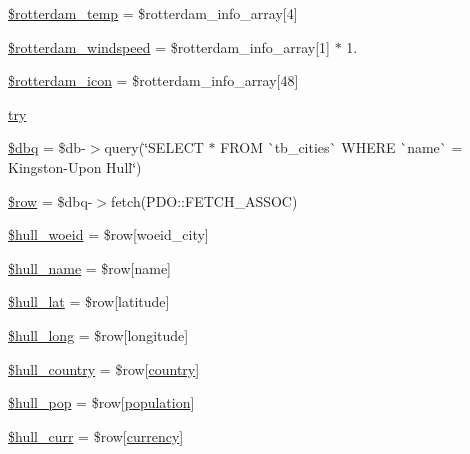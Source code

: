 \begin{DoxyCompactItemize}
\item 
\mbox{\hyperlink{index_8php_a7d5783f258dc82ac9156c855be8f2d9a}{\$rotterdam\+\_\+temp}} = \$rotterdam\+\_\+info\+\_\+array\mbox{[}4\mbox{]}
\item 
\mbox{\hyperlink{index_8php_a9e1bd1fab9ba49731a47922e12661ef5}{\$rotterdam\+\_\+windspeed}} = \$rotterdam\+\_\+info\+\_\+array\mbox{[}1\mbox{]} $\ast$ 1.
\item 
\mbox{\hyperlink{index_8php_a917dfb18ffe5dce2f66b78a2ab25bb2e}{\$rotterdam\+\_\+icon}} = \$rotterdam\+\_\+info\+\_\+array\mbox{[}48\mbox{]}
\item 
\mbox{\hyperlink{index_8php_a3d12b343d049cdea93240f06b0e8467c}{try}}
\item 
\mbox{\hyperlink{index_8php_ab76933014035168a37e7e525ca8fbabe}{\$dbq}} = \$db-\/$>$query(\char`\"{}S\+E\+L\+E\+CT $\ast$ F\+R\+OM \`{}tb\+\_\+cities\`{} W\+H\+E\+RE \`{}name\`{} = \textquotesingle{}Kingston-\/Upon Hull\textquotesingle{}\char`\"{})
\item 
\mbox{\hyperlink{index_8php_aa1d731aa570613e5bcff831bb10e9b87}{\$row}} = \$dbq-\/$>$fetch(P\+D\+O\+::\+F\+E\+T\+C\+H\+\_\+\+A\+S\+S\+OC)
\item 
\mbox{\hyperlink{index_8php_a0255f88ae7eba38efbea0defdb8268a2}{\$hull\+\_\+woeid}} = \$row\mbox{[}\textquotesingle{}woeid\+\_\+city\textquotesingle{}\mbox{]}
\item 
\mbox{\hyperlink{index_8php_a5152ab3c5de633a3e7e5620ac57cf288}{\$hull\+\_\+name}} = \$row\mbox{[}\textquotesingle{}name\textquotesingle{}\mbox{]}
\item 
\mbox{\hyperlink{index_8php_a579767912e585d5819aa7bfe22e174f8}{\$hull\+\_\+lat}} = \$row\mbox{[}\textquotesingle{}latitude\textquotesingle{}\mbox{]}
\item 
\mbox{\hyperlink{index_8php_af542f209855ac8d02cd14c494f6ea9c9}{\$hull\+\_\+long}} = \$row\mbox{[}\textquotesingle{}longitude\textquotesingle{}\mbox{]}
\item 
\mbox{\hyperlink{index_8php_afba36b1379b54ac2b75e704c548b3f2c}{\$hull\+\_\+country}} = \$row\mbox{[}\textquotesingle{}\mbox{\hyperlink{index_8php_a0f0752705301c982dc8994ebc993e6e9}{country}}\textquotesingle{}\mbox{]}
\item 
\mbox{\hyperlink{index_8php_a009564d1c0613f4835396733f31920c0}{\$hull\+\_\+pop}} = \$row\mbox{[}\textquotesingle{}\mbox{\hyperlink{index_8php_aa78fa356925cd3f67d485c4d6846202b}{population}}\textquotesingle{}\mbox{]}
\item 
\mbox{\hyperlink{index_8php_a0a1e0de1e05cca55159a2ce410ea2ac9}{\$hull\+\_\+curr}} = \$row\mbox{[}\textquotesingle{}\mbox{\hyperlink{index_8php_abd84e0698c321abdbf211d5b8425d0b5}{currency}}\textquotesingle{}\mbox{]}

\end{DoxyCompactItemize}
